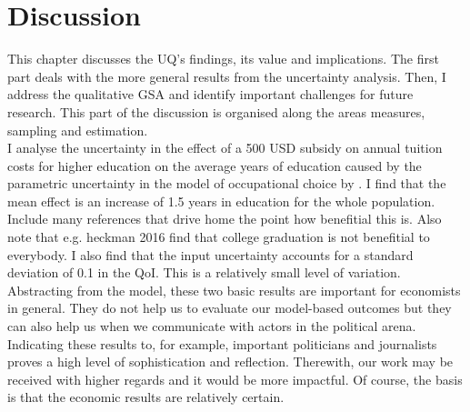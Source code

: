 \section{Discussion}
\thispagestyle{plain}  %

This chapter discusses the UQ's findings, its value and implications. The first part deals with the more general results from the uncertainty analysis. Then, I address the qualitative GSA and identify important challenges for future research. This part of the discussion is organised along the areas measures, sampling and estimation.\\

\noindent
I analyse the uncertainty in  the effect of a 500 USD subsidy on annual tuition costs for higher education on the average years of education caused by the parametric uncertainty in the model of occupational choice by \cite{Keane.1994}. I find that the mean effect is an increase of 1.5 years in education for the whole population. {\color{red}Include many references that drive home the point how benefitial this is. Also note that e.g. heckman 2016 find that college graduation is not benefitial to everybody.}
I also find that the input uncertainty accounts for a standard deviation of 0.1 in the QoI. This is a relatively small level of variation. Abstracting from the model, these two basic results are important for economists in general. They do not help us to evaluate our model-based outcomes but they can also help us when we communicate with actors in the political arena. Indicating these results to, for example, important politicians and journalists proves a high level of sophistication and reflection. Therewith, our work may be received with higher regards and it would be more impactful. Of course, the basis is that the economic results are relatively certain.\\

